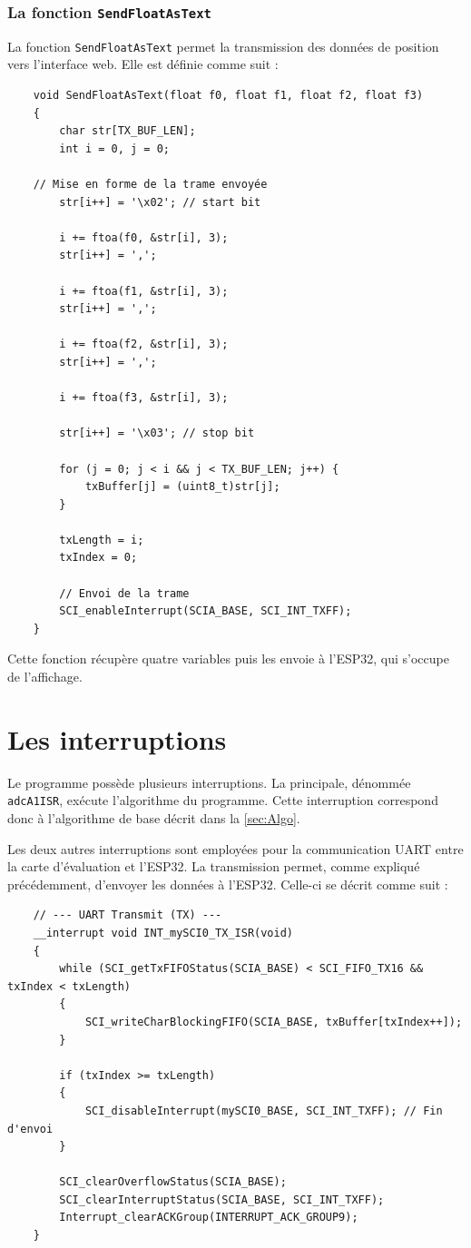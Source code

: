 \subsubsection{La fonction \texttt{SendFloatAsText}}
La fonction \texttt{SendFloatAsText} permet la transmission des données de position vers l'interface web. Elle est définie comme suit :

\begin{verbatim}
    void SendFloatAsText(float f0, float f1, float f2, float f3)
    {
        char str[TX_BUF_LEN];
        int i = 0, j = 0;

    // Mise en forme de la trame envoyée
        str[i++] = '\x02'; // start bit

        i += ftoa(f0, &str[i], 3);
        str[i++] = ',';

        i += ftoa(f1, &str[i], 3);
        str[i++] = ',';

        i += ftoa(f2, &str[i], 3);
        str[i++] = ',';

        i += ftoa(f3, &str[i], 3);

        str[i++] = '\x03'; // stop bit

        for (j = 0; j < i && j < TX_BUF_LEN; j++) {
            txBuffer[j] = (uint8_t)str[j];
        }

        txLength = i;
        txIndex = 0;

        // Envoi de la trame
        SCI_enableInterrupt(SCIA_BASE, SCI_INT_TXFF);
    }
\end{verbatim}

Cette fonction récupère quatre variables puis les envoie à l'ESP32, qui s'occupe de l'affichage.

\section{Les interruptions}
Le programme possède plusieurs interruptions. La principale, dénommée \texttt{adcA1ISR}, exécute l'algorithme du programme. Cette interruption correspond donc à l'algorithme de base décrit dans la \autoref{sec:Algo}.

Les deux autres interruptions sont employées pour la communication UART entre la carte d'évaluation et l'ESP32. La transmission permet, comme expliqué précédemment, d'envoyer les données à l'ESP32. Celle-ci se décrit comme suit :

\begin{verbatim}
    // --- UART Transmit (TX) ---
    __interrupt void INT_mySCI0_TX_ISR(void)
    {
        while (SCI_getTxFIFOStatus(SCIA_BASE) < SCI_FIFO_TX16 && txIndex < txLength)
        {
            SCI_writeCharBlockingFIFO(SCIA_BASE, txBuffer[txIndex++]);
        }

        if (txIndex >= txLength)
        {
            SCI_disableInterrupt(mySCI0_BASE, SCI_INT_TXFF); // Fin d'envoi
        }

        SCI_clearOverflowStatus(SCIA_BASE);
        SCI_clearInterruptStatus(SCIA_BASE, SCI_INT_TXFF);
        Interrupt_clearACKGroup(INTERRUPT_ACK_GROUP9);
    }
\end{verbatim}

